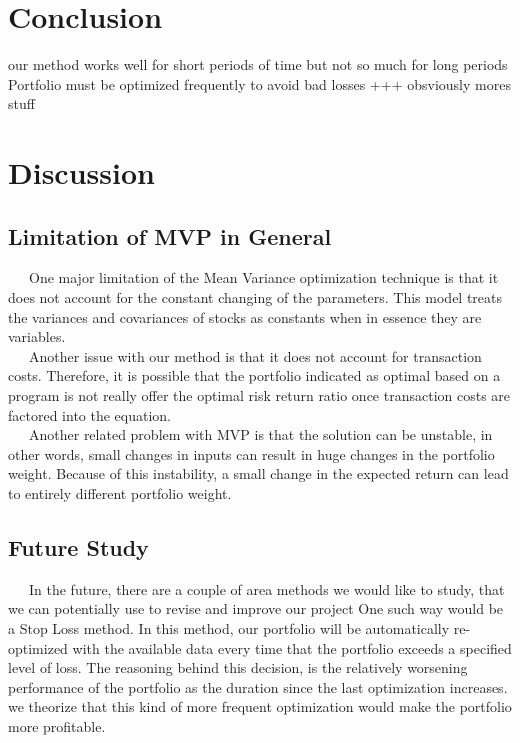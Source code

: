 \documentclass[12pt,titlepage,a4paper]{article}
\begin{document}
\section{Conclusion}
our method works well for short periods of time but not so much for long periods
Portfolio must be optimized frequently to avoid bad losses +++ obsviously mores stuff\\

\section{Discussion}
\subsection{Limitation of MVP in General}
\ \ \ One major limitation of the Mean Variance optimization technique is that it does not account for the constant changing of the parameters. This model treats the variances and covariances of stocks as constants when in essence they are variables. \\

\ \ \ Another issue with our method is that it does not account for transaction costs. Therefore, it is possible that the portfolio indicated as optimal based on a program is not really offer the optimal risk return ratio once transaction costs are factored into the equation.\\

\ \ \ Another related problem with MVP is that the solution can be unstable, in other words, small changes in inputs can result in huge changes in the portfolio weight. Because of this instability, a small change in the expected return can lead to entirely different portfolio weight. \\

\subsection{Future Study}
\ \ \ In the future, there are a couple of area methods we would like to study, that we can potentially use to revise and improve our project
One such way would be a Stop Loss method. In this method, our portfolio will be automatically re-optimized with the available data every time that the portfolio exceeds a specified level of loss. The reasoning behind this decision, is the relatively worsening performance of the portfolio as the duration since the last optimization increases. we theorize that this kind of more frequent 
optimization would make the portfolio more profitable.\\
\end{document}
